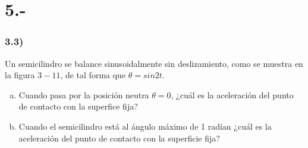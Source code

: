 \documentclass{article}
\begin{document}
\section*{5.-}
\subsubsection*{3.3)}
Un semicilindro se balance sinusoidalmente sin deslizamiento, como se muestra en la figura 
$3-11$, de tal forma que $\theta = sin2t$. 
\begin{enumerate}[a)]
    \item Cuando pasa por la posición neutra $\theta=0$, ¿cuál es la aceleración del punto
    de contacto con la superfice fija?
    \item Cuando el semicilindro está al ángulo máximo de 1 radían ¿cuál es la aceleración 
    del punto de contacto con la superficie fija?
\end{enumerate}
\end{document}
